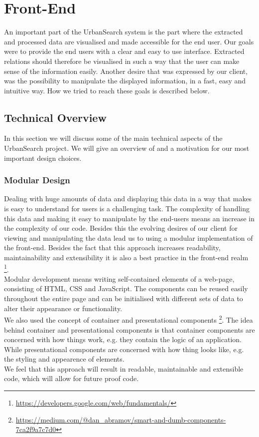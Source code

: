 \section{Front-End}\label{sec 5-front-end}
An important part of the UrbanSearch system is the part where the extracted and processed data are visualised and made accessible for the end user. Our goals were to provide the end users with a clear and easy to use interface. Extracted relations should therefore be visualised in such a way that the user can make sense of the information easily. Another desire that was expressed by our client, was the possibility to manipulate the displayed information, in a fast, easy and intuitive way. How we tried to reach these goals is described below.

\subsection{Technical Overview}
In this section we will discuss some of the main technical aspects of the UrbanSearch project. We will give an overview of and a motivation for our most important design choices.

\subsubsection{Modular Design}
Dealing with huge amounts of data and displaying this data in a way that makes is easy to understand for users is a challenging task. The complexity of handling this data and making it easy to manipulate by the end-users means an increase in the complexity of our code. Besides this the evolving desires of our client for viewing and manipulating the data lead us to using a modular implementation of the front-end.
Besides the fact that this approach increases readability, maintainability and extensibility it is also a best practice in the front-end realm \footnote{\url{https://developers.google.com/web/fundamentals/}}.\\
Modular development means writing self-contained elements of a web-page, consisting of HTML, CSS and JavaScript. The components can be reused easily throughout the entire page and can be initialised with different sets of data to alter their appearance or functionality.\\
We also used the concept of container and presentational components \footnote{\url{https://medium.com/@dan_abramov/smart-and-dumb-components-7ca2f9a7c7d0}}. The idea behind container and presentational components is that container components are concerned with how things work, e.g. they contain the logic of an application. While presentational components are concerned with how thing looks like, e.g. the styling and appearence of elements.\\
We feel that this approach will result in readable, maintainable and extensible code, which will allow for future proof code.
